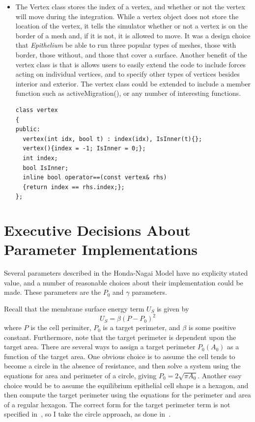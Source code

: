 \begin{itemize}
\begin{lstlisting}
\end{lstlisting}

\item The {\color{green} Vertex} class stores the index of a vertex, and 
whether or not the vertex will move during the integration. While a 
vertex object does not store the location of the vertex, it tells the 
simulator whether or not a vertex is on the border of a mesh and, if it 
is not, it is allowed to move. It was a design choice that 
\emph{Epithelium} be able to run three popular types of meshes, those 
with border, those without, and those that cover a surface.  Another 
benefit of the vertex class is that is allows users to easily extend 
the code to include forces acting on individual vertices, and to 
specify other types of vertices besides interior and exterior. The 
vertex class could be extended to include a member function such as 
activeMigration(), or any number of interesting functions.
\begin{lstlisting}
class vertex
{
public:
  vertex(int idx, bool t) : index(idx), IsInner(t){};
  vertex(){index = -1; IsInner = 0;};
  int index;
  bool IsInner;
  inline bool operator==(const vertex& rhs)
  {return index == rhs.index;};
};
\end{lstlisting}
\end{itemize}

\section{Executive Decisions About Parameter Implementations}
Several parameters described in the Honda-Nagai Model have no explicity stated value, and a number of reasonable choices about their implementation could be made. These parameters are the $P_0$ and $\gamma$ parameters. 

Recall that the membrane surface energy term $U_S$ is given by
\begin{equation}
U_S = \beta(P - P_0)^2
\end{equation}
 where $P$ is the cell perimiter, $P_0$ is a target perimeter, and $\beta$ is some positive constant. Furthermore, note that the target perimeter is dependent upon the target area. There are several ways to assign a target perimeter $P_0(A_0)$ as a function of the target area. One obvious choice is to assume the cell tends to become a circle in the absence of resistance, and then solve a system using the equations for area and perimeter of a circle, giving $P_0 =2\sqrt{\pi A_0}$. Another easy choice would be to assume the equilibrium epithelial cell shape is a hexagon, and then compute the target perimeter using the equations for the perimeter and area of a regular hexagon. The correct form for the target perimeter term is not specified in~\cite{HondaNagai}, so I take the circle approach, as done in~\cite{ChasteMain}.

